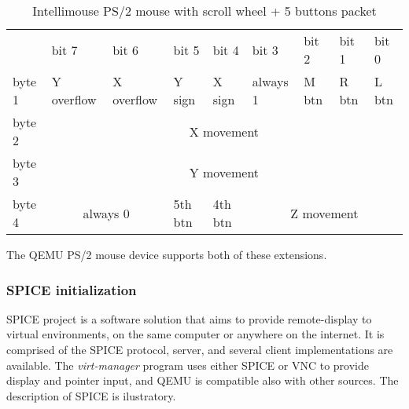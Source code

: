 \begin{table}[H]
    \begin{tabular}{lllllllll}
        & bit 7 & bit 6 & bit 5 & bit 4 & bit 3 & bit 2 & bit 1 & bit 0 \\

        \cline{2-9} 

        \multicolumn{1}{l|}{byte 1}     & \multicolumn{1}{l|}{Y overflow}   &
        \multicolumn{1}{l|}{X overflow} & \multicolumn{1}{l|}{Y sign}       &
        \multicolumn{1}{l|}{X sign}     & \multicolumn{1}{l|}{always 1}     &
        \multicolumn{1}{l|}{M btn}      & \multicolumn{1}{l|}{R btn}        &
        \multicolumn{1}{l|}{L btn} \\

        \cline{2-9} 

        \multicolumn{1}{l|}{byte 2} & \multicolumn{8}{c|}{X movement} \\

        \cline{2-9} 

        \multicolumn{1}{l|}{byte 3} & \multicolumn{8}{c|}{Y movement} \\

        \cline{2-9} 

        \multicolumn{1}{l|}{byte 4}     & \multicolumn{2}{c|}{always 0} &
        \multicolumn{1}{l|}{5th btn}    & \multicolumn{1}{l|}{4th btn}  &
        \multicolumn{4}{c|}{Z movement} \\

        \cline{2-9} 
    \end{tabular}
    \caption{Intellimouse PS/2 mouse with scroll wheel + 5 buttons packet \cite{ps2interface}}
    \label{table:imps25buttons}
\end{table}

\noindent
The QEMU PS/2 mouse device supports both of these extensions.


\subsubsection{SPICE initialization}

SPICE project is a software solution that aims to provide remote-display to
virtual environments, on the same computer or anywhere on the internet.  It is
comprised of the SPICE protocol, server, and several client implementations are
available.  The \emph{virt-manager} program uses either SPICE or VNC to provide
display and pointer input, and QEMU is compatible also with other sources.  The
description of SPICE is ilustratory. %

